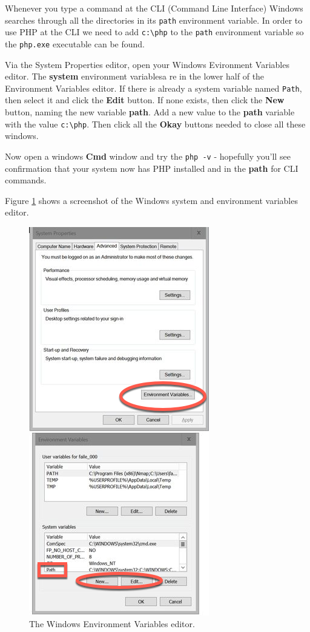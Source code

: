 \documentclass[a4paperpaper,openright]{book}
\begin{document}
Whenever you type a command at the CLI (Command Line Interface) Windows
searches through all the directories in its \texttt{path} environment
variable. In order to use PHP at the CLI we need to add
\texttt{c:\textbackslash{}php} to the \texttt{path} environment variable
so the \texttt{php.exe} executable can be found.

Via the System Properties editor, open your Windows Evironment Variables
editor. The \textbf{system} environment variablesa re in the lower half
of the Environment Variables editor. If there is already a system
variable named \texttt{Path}, then select it and click the \textbf{Edit}
button. If none exists, then click the \textbf{New} button, naming the
new variable \textbf{path}. Add a new value to the \textbf{path}
variable with the value \texttt{c:\textbackslash{}php}. Then click all
the \textbf{Okay} buttons needed to close all these windows.

Now open a windows \textbf{Cmd} window and try the \texttt{php\ -v} -
hopefully you'll see confirmation that your system now has PHP installed
and in the \textbf{path} for CLI commands.

Figure \ref{env2} shows a screenshot of the Windows system and
environment variables editor.

\begin{figure}
\centering
\includegraphics{./tex2pdf.-8aed53dcd332a606/eb1ab9d21c784b824e4103ff64f0448e7b0e6122.png}
\caption{The Windows Environment Variables editor. \label{env2}}
\end{figure}
\end{document}
